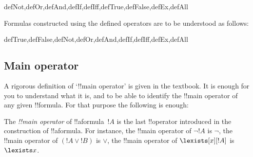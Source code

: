 \documentclass[../../../../include/open-logic-section]{subfiles}
\begin{document}
\begin{tagblock}{defNot,defOr,defAnd,defIf,defIff,defTrue,defFalse,defEx,defAll}
    \begin{defn}
    Formulas constructed using the defined operators are to be understood
    as follows:
    
    \begin{tagenumerate}{defTrue,defFalse,defNot,defOr,defAnd,defIf,defIff,defEx,defAll}
    
    
    
    
    
    
    
    
    
    \end{tagenumerate}
    \end{defn}
\end{tagblock}

\subsection{Main operator}

A rigorous definition of `!!{main operator}' is given in the textbook.
It is enough for you to understand what it is, and to be able to 
identify the !!{main operator} of any given !!{formula}. For that
purpose the following is enough:

\begin{defn}
    The \emph{!!{main operator}} of !!a{formula}~$!A$ is the last 
    !!{operator} introduced in the construction of !!a{formula}. 
    For instance, the !!{main operator} of $\lnot !A$ is $\lnot$,
the !!{main operator} of $(!A \lor !B)$ is $\lor$, the 
!!{main operator} of $\lexists[x][!A]$ is $\lexists x$.
\end{defn}
\end{document}
